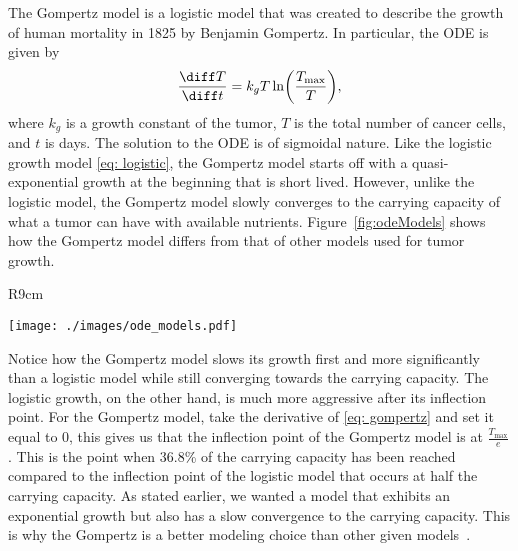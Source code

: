 \documentclass[11pt]{amsart}
\begin{document}
The Gompertz model is a logistic model that was created to describe the growth of human mortality in 1825 by Benjamin Gompertz.
In particular, the ODE is given by
\begin{equation}
	\frac{\diff T}{\diff t} = k_g T \ln \biggl(\frac{T_{\max}}{T} \biggr) \label{eq: gompertz},
\end{equation}
where $k_g$ is a growth constant of the tumor, $T$ is the total number of cancer cells, and $t$ is days.
The solution to the ODE is of sigmoidal nature.
Like the logistic growth model \eqref{eq: logistic}, the Gompertz model starts off with a quasi-exponential growth at the beginning that is short lived.
However, unlike the logistic model, the Gompertz model slowly converges to the carrying capacity of what a tumor can have with available nutrients.
Figure~\ref{fig:odeModels} shows how the Gompertz model differs from that of other models used for tumor growth.

\begin{wrapfigure}[18]{R}{9cm}
  \centering
    \vspace*{-42mm}
    	\begin{varwidth}{\linewidth}
		 \texttt{[image: ./images/ode\_models.pdf]}
		 \captionsetup{justification=centering, width=5cm}
		 \caption{The uninhibited growth of various ODE models}
		 \label{fig:odeModels}
	\end{varwidth}
	\vspace*{-40mm}
\end{wrapfigure}

Notice how the Gompertz model slows its growth first and more significantly than a logistic model while still converging towards the carrying capacity.
The logistic growth, on the other hand, is much more aggressive after its inflection point.
For the Gompertz model, take the derivative of \eqref{eq: gompertz} and set it equal to 0, this gives us that  the inflection point of the Gompertz model is at $\frac{T_{\max}}{e}$.
This is the point when 36.8\% of the carrying capacity has been reached compared to the inflection point of the logistic model that occurs at half the carrying capacity.
As stated earlier, we wanted a model that exhibits an exponential growth but also has a slow convergence to the carrying capacity.
This is why the Gompertz is a better modeling choice than other given models\ \cite{LairdGompertz}. 
\end{document}
